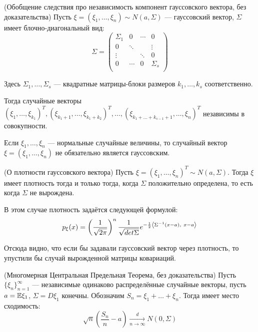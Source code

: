 \begin{corollary}  (Обобщение следствия про независимость компонент гауссовского вектора, без доказательства)
    Пусть $\xi = (\xi_1, \ldots, \xi_n) \sim N(a, \Sigma)$ --- гауссовский вектор, $\Sigma$ имеет блочно-диагональный вид:
    \[
        \Sigma =
        \begin{pmatrix}
            \Sigma_1 & 0 & \cdots & 0 \\
            0 & \ddots & & \vdots \\
            \vdots & & \ddots & 0 \\
            0 & \cdots & 0 & \Sigma_s \\
        \end{pmatrix}
    \]
    
    Здесь $\Sigma_1, \ldots, \Sigma_s$ --- квадратные матрицы-блоки размеров $k_1, \ldots, k_s$ соответственно.

    Тогда случайные векторы $(\xi_1, \ldots, \xi_{k_1})^T, (\xi_{k_1+1}, \ldots, \xi_{k_1+k_2})^T, \ldots, (\xi_{k_1 + \ldots + k_{s-1} +1}, \ldots, \xi_n)^T$ независимы в совокупности.
\end{corollary}

\begin{exercise}
    Если  $\xi_1, \ldots, \xi_n$ --- нормальные случайные величины, то случайный вектор $\xi = (\xi_1, \ldots, \xi_n)$ не обязательно является гауссовским.
\end{exercise}

\begin{exercise} (О плотности гауссовского вектора)
    Пусть $\xi = (\xi_1, \ldots, \xi_n)^T \sim N(a, \Sigma)$. Тогда $\xi$ имеет плотность тогда и только тогда, когда $\Sigma$ положительно определена, то есть когда $\Sigma$ не вырождена.

    В этом случае плотность задаётся следующей формулой:
    \[
        p_\xi(x) = \left( \frac{1}{\sqrt{2\pi}} \right)^n \frac{1}{\sqrt{det \Sigma}} e^{-\frac{1}{2} \tbr{\Sigma^{-1}(x-a),\ x-a}}
    \]
\end{exercise}

\begin{note}
    Отсюда видно, что если бы задавали гауссовский вектор через плотность, то упустили бы случай вырожденной матрицы ковариаций.
\end{note}

\begin{theorem} (Многомерная Центральная Предельная Теорема, без доказательства)
    Пусть $\{\xi_n\}_{n = 1}^\infty$ --- независимые одинаково распределённые случайные векторы, пусть $a = \mathbb{E}\xi_1$, $\Sigma = D\xi_1$ конечны. Обозначим $S_n = \xi_1 + \ldots + \xi_n$. Тогда имеет место сходимость:
    \[
        \sqrt{n} \left( \frac{S_n}{n} - a \right) \xrightarrow[n \to \infty]{d} N(0, \Sigma)
    \]
\end{theorem}

